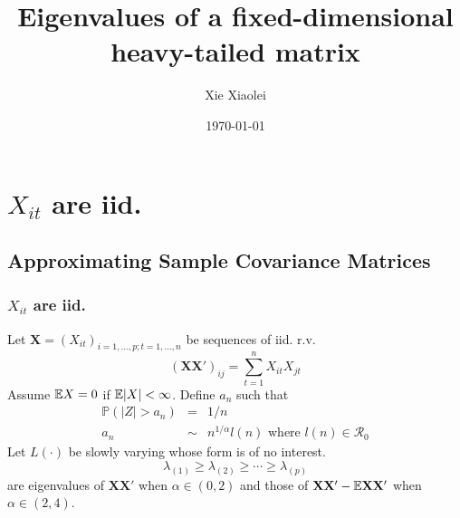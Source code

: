 \documentclass{beamer}
\title{Eigenvalues of a fixed-dimensional heavy-tailed matrix} %
\author{Xie Xiaolei} %
\institute[UCPH] %
{
Copenhagen University  \\ %
\medskip
\textit{xie.xiaolei@gmail.com} %
}
\date{\today} %
\renewcommand{\P}{
\mathbb P
}
\begin{document}
\begin{frame}
\titlepage %
\end{frame}


\section[iid data]{$X_{it}$ are iid.}
\subsection{Approximating Sample Covariance Matrices}
\begin{frame}
  \frametitle{$X_{it}$ are iid.}
  Let $\mathbf X = (X_{it})_{i=1,\dots,p; t = 1,\dots, n}$ be sequences of iid. r.v.
  \[
  (\mathbf{XX'})_{ij} = \sum_{t=1}^n X_{it}X_{jt}
  \]
  Assume $\mathbb{E} X = 0$ if $\mathbb{E} |X| < \infty$. Define $a_n$ such that
  \begin{eqnarray*}
    \P(|Z| > a_n) &=& 1/n  \\
    a_n &\sim& n^{1/\alpha} l(n) \text{ where } l(n) \in \mathcal R_{0}
  \end{eqnarray*}
  Let $L(\cdot)$ be slowly varying whose form is of no interest.
  \[
  \lambda_{(1)} \geq \lambda_{(2)} \geq \cdots \geq \lambda_{(p)}
  \]
  are eigenvalues of $\mathbf{XX'}$ when $\alpha \in (0, 2)$ and those of $\mathbf{XX'}
  - \mathbb{E} \mathbf{XX'}$ when $\alpha \in (2, 4)$.
\end{frame}

\end{document}
